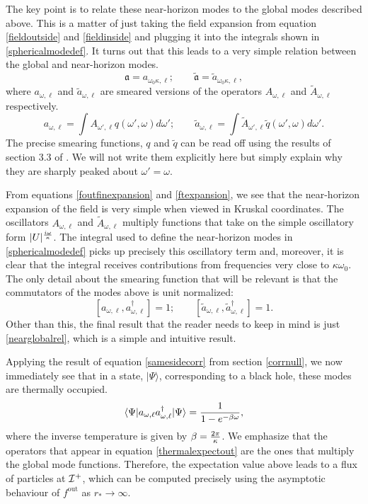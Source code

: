 \documentclass[12pt]{article}
\def\fout{f^{\text{out}}}
\newcommand{\cop}[1]{#1}
\def\ta{\widetilde{\cop{a}}}
\def\rtor{{r_*}}
\newcommand{\be}{\begin{equation}}
\newcommand{\ee}{\end{equation}}
\def \anh {\mathfrak{a}}
\def \tildanh {\widetilde{\mathfrak{a}}}
\def \scrip{{\cal I}^{+}}
\begin{document}
The key point is to relate these near-horizon modes to the global modes described above. This is a matter of just taking the field expansion from equation \eqref{fieldoutside} and \eqref{fieldinside} and plugging it into the integrals shown in \eqref{sphericalmodedef}.  It turns out that this leads to a very simple relation between the global and near-horizon modes.
\be
\label{nearglobalrel}
\anh = a_{\omega_0 \kappa, \ell}; \qquad \tildanh = \widetilde{a}_{\omega_0 \kappa, \ell},
\ee
where $a_{\omega, \ell}$ and $\widetilde{a}_{\omega, \ell}$ are smeared versions of the operators $A_{\omega, \ell}$ and $\widetilde{A}_{\omega, \ell}$ respectively.
\be
\label{smearing}
a_{\omega, \ell} = \int A_{\omega', \ell} q(\omega', \omega) d \omega'; \qquad \widetilde{a}_{\omega, \ell} = \int \widetilde{A}_{\omega', \ell} \widetilde{q}(\omega',\omega) d \omega'.
\ee
The precise smearing functions, $q$ and $\widetilde{q}$  can be read off using the results of section 3.3 of \cite{Papadodimas:2019msp}. We will not write them explicitly here but simply explain why they are sharply peaked about $\omega' = \omega$.

From equations \eqref{foutfinexpansion} and \eqref{ftexpansion}, we see that the near-horizon expansion of the field is very simple when viewed in Kruskal coordinates. The oscillators $A_{\omega, \ell}$ and $\widetilde{A}_{\omega, \ell}$ multiply functions that take on the simple oscillatory form  $|U|^{i \omega \over \kappa}$.  The integral used to define the near-horizon modes in \eqref{sphericalmodedef} picks up precisely this oscillatory term and, moreover,  it is clear that the integral receives contributions from frequencies very close to $\kappa \omega_0$. The only detail about the smearing function that will be relevant is
that the commutators of the modes above is unit normalized:
\be
\label{normofcomm}
[a_{\omega, \ell}, a_{\omega, \ell}^{\dagger}] = 1; \qquad [\ta_{\omega, \ell}, \ta_{\omega, \ell}^{\dagger}] = 1.
\ee
Other than this, the  final result that the reader needs to keep in mind is just \eqref{nearglobalrel}, which is a simple and intuitive result.


Applying the result of equation \eqref{samesidecorr} from section \ref{corrnull}, we now immediately see that in a state, $|\Psi \rangle$, corresponding to a black hole, these modes are thermally occupied.
\be
\label{thermalexpectout}
\langle \Psi | a_{\omega, \ell} a_{\omega, \ell}^{\dagger} | \Psi  \rangle = {1 \over 1 - e^{-\beta \omega}},
\ee
where the inverse temperature is given by $\beta = {2 \pi \over \kappa}$.
We emphasize that the operators that appear in equation \eqref{thermalexpectout} are the ones that multiply the global mode functions. Therefore,  the expectation value above leads to a flux of particles at $\scrip$, which can be computed precisely using the asymptotic behaviour of $\fout$ as $\rtor \rightarrow \infty$.
\end{document}
